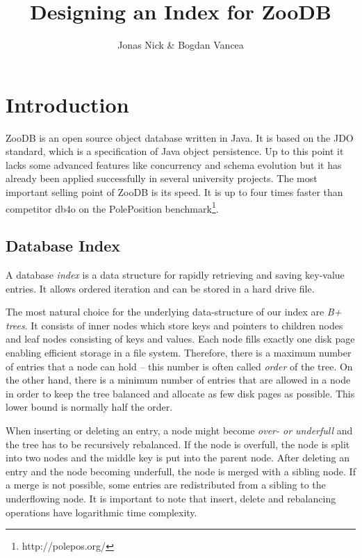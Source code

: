 \documentclass[11pt,a4paper,oneside]{article}
\begin{document}
\graphicspath{ {images/} }
\title{Designing an Index for ZooDB}
\author{Jonas Nick \& Bogdan Vancea}
\maketitle
\tableofcontents
\clearpage

\section{Introduction}
ZooDB is an open source object database written in Java. It is based on the JDO standard, which is a specification of Java object persistence.
Up to this point it lacks some advanced features like concurrency and schema evolution but it has already been applied successfully in several university projects. 
The most important selling point of ZooDB is its speed. It is up to four times faster than competitor db4o on the PolePosition benchmark\footnote{http://polepos.org/}.

\subsection{Database Index}
A database \emph{index} is a data structure for rapidly retrieving and saving key-value entries. 
It allows ordered iteration and can be stored in a hard drive file.

The most natural choice for the underlying data-structure of our index are \emph{B+ trees}.
It consists of inner nodes which store keys and pointers to children nodes and leaf nodes consisting of keys and values.
Each node fills exactly one disk page enabling efficient storage in a file system.
Therefore, there is a maximum number of entries that a node can hold -- this number is often called \emph{order} of the tree.
On the other hand, there is a minimum number of entries that are allowed in a node in order to keep the tree balanced and allocate as few disk pages as possible.
This lower bound is normally half the order.

When inserting or deleting an entry, a node might become \emph{over- or underfull} and the tree has to be recursively rebalanced.
If the node is overfull, the node is split into two nodes and the middle key is put into the parent node.
After deleting an entry and the node becoming underfull, the node is merged with a sibling node. If a merge is not possible, some entries are redistributed from a sibling to the underflowing node.
It is important to note that insert, delete and rebalancing operations have logarithmic time complexity.
\end{document}
